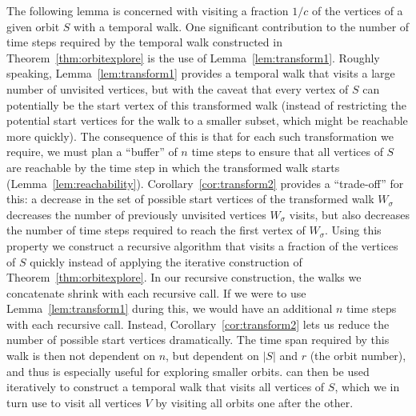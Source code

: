     {The following lemma is concerned with visiting a fraction $1/c$
of the vertices of a given orbit $S$ with a temporal walk. One significant
contribution to the number of time steps required by the temporal walk
constructed in Theorem~\ref{thm:orbitexplore} is the use of
Lemma~\ref{lem:transform1}. Roughly speaking, Lemma~\ref{lem:transform1}
provides a temporal walk that visits a large number of unvisited vertices, but
with the caveat that every vertex of $S$ can potentially be the start vertex of this
transformed walk (instead of restricting the potential start vertices
for the walk to a smaller subset, which might be reachable more quickly).
The consequence of this is that for each such transformation we require,
we must plan a ``buffer'' of $n$ time steps to ensure that all vertices of $S$ are
reachable by the time step in which the transformed walk starts (Lemma~\ref{lem:reachability}).
Corollary~\ref{cor:transform2} provides a ``trade-off'' for this: a decrease in
the set of possible start vertices of the transformed walk $W_{\sigma}$
decreases the number of previously unvisited vertices $W_{\sigma}$ visits, but
also decreases the number of time steps required to reach the first vertex of
$W_{\sigma}$. Using this property we construct a recursive algorithm that visits
a fraction of the vertices of $S$ quickly instead of applying the iterative construction of
Theorem~\ref{thm:orbitexplore}. In our recursive construction,
the walks we concatenate shrink with each recursive call. If we were to use
Lemma~\ref{lem:transform1} during this, we would have an additional $n$ time
steps with each recursive call. Instead, Corollary~\ref{cor:transform2} lets us
reduce the number of possible start vertices dramatically. The time span required
by this walk is then not dependent on $n$, but dependent on $|S|$ and $r$ (the
orbit number), and thus is especially useful for exploring smaller orbits.
can
then be used iteratively to construct a
temporal walk that visits all vertices of $S$, which we in turn use to visit all
vertices $V$ by visiting all orbits one after the other. }


\newcommand{\ww}{u}

